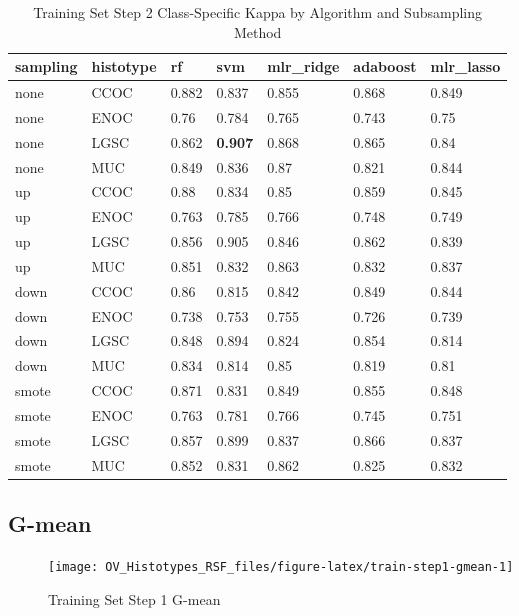 \documentclass[
]{report}
\begin{document}
\begin{table}

\caption{\label{tab:train-step2-kappa-class-table}Training Set Step 2 Class-Specific Kappa by Algorithm and Subsampling Method}
\centering
\begin{tabular}[t]{l|l|l|l|l|l|l}
\hline
sampling & histotype & rf & svm & mlr\_ridge & adaboost & mlr\_lasso\\
\hline
none & CCOC & 0.882 & 0.837 & 0.855 & 0.868 & 0.849\\
\hline
none & ENOC & 0.76 & 0.784 & 0.765 & 0.743 & 0.75\\
\hline
none & LGSC & 0.862 & \textbf{0.907} & 0.868 & 0.865 & 0.84\\
\hline
none & MUC & 0.849 & 0.836 & 0.87 & 0.821 & 0.844\\
\hline
up & CCOC & 0.88 & 0.834 & 0.85 & 0.859 & 0.845\\
\hline
up & ENOC & 0.763 & 0.785 & 0.766 & 0.748 & 0.749\\
\hline
up & LGSC & 0.856 & 0.905 & 0.846 & 0.862 & 0.839\\
\hline
up & MUC & 0.851 & 0.832 & 0.863 & 0.832 & 0.837\\
\hline
down & CCOC & 0.86 & 0.815 & 0.842 & 0.849 & 0.844\\
\hline
down & ENOC & 0.738 & 0.753 & 0.755 & 0.726 & 0.739\\
\hline
down & LGSC & 0.848 & 0.894 & 0.824 & 0.854 & 0.814\\
\hline
down & MUC & 0.834 & 0.814 & 0.85 & 0.819 & 0.81\\
\hline
smote & CCOC & 0.871 & 0.831 & 0.849 & 0.855 & 0.848\\
\hline
smote & ENOC & 0.763 & 0.781 & 0.766 & 0.745 & 0.751\\
\hline
smote & LGSC & 0.857 & 0.899 & 0.837 & 0.866 & 0.837\\
\hline
smote & MUC & 0.852 & 0.831 & 0.862 & 0.825 & 0.832\\
\hline
\end{tabular}
\end{table}

\hypertarget{g-mean-1}{%
\subsection{G-mean}\label{g-mean-1}}

\begin{figure}[H]

{\centering \texttt{[image: OV\_Histotypes\_RSF\_files/figure-latex/train-step1-gmean-1]} 

}

\caption{Training Set Step 1 G-mean}\label{fig:train-step1-gmean}
\end{figure}
\end{document}
